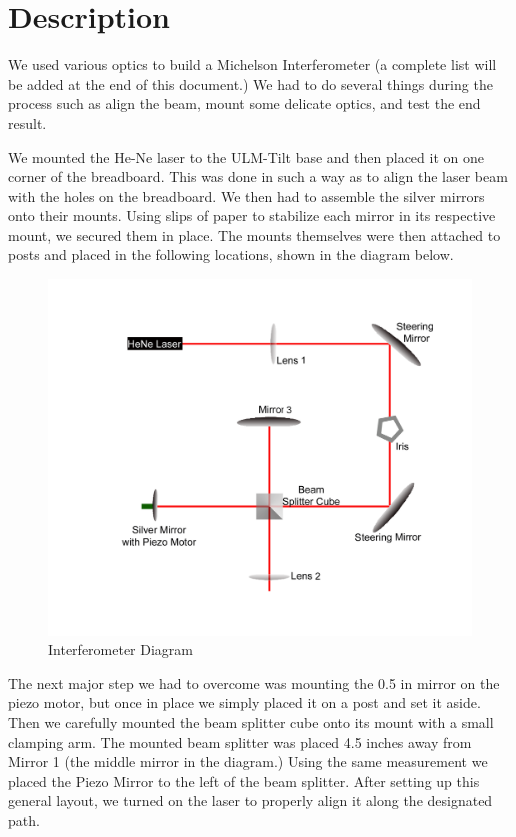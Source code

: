 \section{Description}


We used various optics to build a Michelson Interferometer (a  complete list will be added at the end of this document.) We had to do several things during the process such as align the beam, mount some delicate optics, and test the end result. 

We mounted the He-Ne laser to the ULM-Tilt base and then placed it on one corner of the breadboard. This was done in such a way as to align the laser beam with the holes on the breadboard. We then had to assemble the silver mirrors onto their mounts. Using slips of paper to stabilize each mirror in its respective mount, we secured them in place. The mounts themselves were then attached to posts and placed in the following locations, shown in the diagram below.

\begin{figure}[ht]
\centering
\includegraphics[width=5.5in]{interferometer}
\caption{Interferometer Diagram}
\label{fig:interferometer}
\end{figure}

The next major step we had to overcome was mounting the 0.5 in mirror on the piezo motor, but once in place we simply placed it on a post and set it aside.  Then we carefully mounted the beam splitter cube onto its mount with a small clamping arm. The mounted beam splitter was placed 4.5 inches away from Mirror 1 (the middle mirror in the diagram.) Using the same measurement we placed the Piezo Mirror to the left of the beam splitter.  After setting up this general layout, we turned on the laser to properly align it along the designated path.

